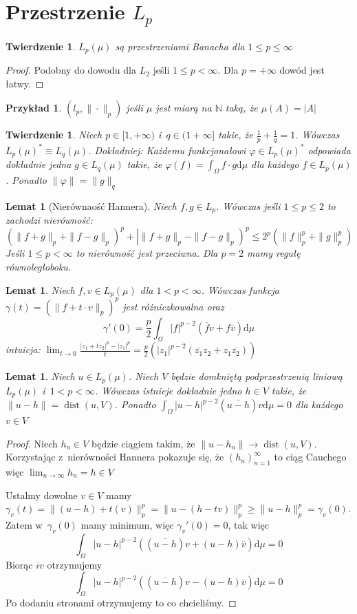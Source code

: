 \documentclass[11pt]{mwrep}
\renewcommand{\[}{\begin{equation}}
\renewcommand{\]}{\end{equation}}
\newcommand{\N}{{\ensuremath{\mathbb N}}}
\newcommand{\dist}{\operatorname{dist}}
\newcommand{\dd}{\mathrm{d}}
\newtheorem{twr}[subsection]{Twierdzenie}%
\newtheorem{lem}[subsection]{Lemat}
\newtheorem{ex}[subsection]{Przykład}
\begin{document}
\section{Przestrzenie $L_p$}
\begin{twr}
	$L_p(\mu)$ są przestrzeniami Banacha dla $1\le p \le\infty$
\end{twr}
\begin{proof}
	Podobny do dowodu dla $L_2$ jeśli $1\le p < \infty$. Dla $p =+ \infty$ dowód jest łatwy. 
\end{proof}
\begin{ex}
	$(l_p, \|\cdot\|_p)$ jeśli $\mu$ jest miarą na $\N$ taką, że $\mu(A) = |A|$ 
\end{ex}
\begin{twr}
	Niech $p \in [1, +\infty)$ i~$q \in (1+\infty]$ takie, że $\frac{1}{p}+\frac{1}{q} = 1$. Wówczas $L_p(\mu)^* \equiv L_q(\mu)$.
	\emph{Dokładniej}: Każdemu funkcjonałowi $\varphi \in L_p(\mu)^*$ odpowiada dokładnie jedna $g \in L_q (\mu)$ takie, że 
	$\varphi(f) = \int_\Omega f\cdot g\dd\mu$ dla każdego $f \in L_p(\mu)$. Ponadto $\|\varphi\| = \|g\|_q$
\end{twr}
\begin{lem}[Nierównaość Hannera]
	Niech $f,g \in L_p$. Wówczas jeśli $1 \le p \le 2$ to zachodzi nierówność: 
	$$\left( \|f+g\|_p + \|f-g\|_p \right)^p + \left| \|f+g\|_p - \|f-g\|_p \right)^p \le 2^p \left( \|f\|_p^p + \|g\|_p^p  \right)$$
	Jeśli $1 \le p < \infty$ to nierówność jest przeciwna. Dla $p=2$ mamy regułę równoległoboku. 
\end{lem}
\begin{lem}
	Niech $f,v \in L_p(\mu)$ dla $1 < p <\infty$. 
	Wówczas funkcja  $\gamma(t) = \left( \|f + t\cdot v \|_p  \right)^p$ jest różniczkowalna oraz 
	$$\gamma'(0) =  \frac{p}{2}\int_\Omega |f|^{p-2}\left(\overline{f} v + f \overline{v}\right) \dd \mu$$
	\emph{intuicja}: $\lim_{t \to 0} \frac{|z_1 + tz_2|^p - |z_1|^p}{t} = 
	\frac{p}{2}\left( |z_1|^{p-2}\left( \overline{z_1}z_2 + z_1 \overline{z_2} \right)\right)$
\end{lem}
\begin{lem}
	Niech $u \in L_p (\mu)$. Niech $V$ będzie domkniętą podprzestrzenią liniową $L_p(\mu)$ i~$1<p<\infty$. 
	Wówczas istnieje dokładnie jedno $h \in V$ takie, że $\|u - h\| = \dist(u,V)$. 
	Ponadto $\int_\Omega |u-h|^{p - 2} \left( \overline{u- h} \right)v \dd \mu =0 $ dla każdego $v \in V$
\end{lem}
\begin{proof}
	Niech $h_n \in V$ będzie ciągiem takim, że $\|u - h_n \| \to \dist(u,V) $.
	Korzystając z~nierówności Hannera pokazuje się, że $(h_n)_{n=1}^\infty$ to ciąg Cauchego więc $\lim_{n \to \infty} h_n =h \in V$\par
	Ustalmy dowolne $v \in V$ mamy 
	$\gamma_v(t) = \|(u-h) + t(v)\|_p^p = \|u - (h-tv) \|_p^p \ge \|u-h\|_p^p = \gamma_v(0) $.
	Zatem w~$\gamma_v(0)$ mamy minimum, więc $\gamma_v'(0) =0$, tak więc
	$$\int_\Omega |u-h|^{p - 2} \left( \left(\overline{u-h}\right) v + \left( u-h \right)\overline{v} \right) \dd \mu =0 $$
	Biorąc $iv$ otrzymujemy 
	$$\int_\Omega |u-h|^{p - 2} \left( \left(\overline{u-h}\right) v - \left( u-h \right)\overline{v} \right) \dd \mu =0 $$
	Po dodaniu stronami otrzymujemy to co chcieliśmy.
\end{proof}
\end{document}
